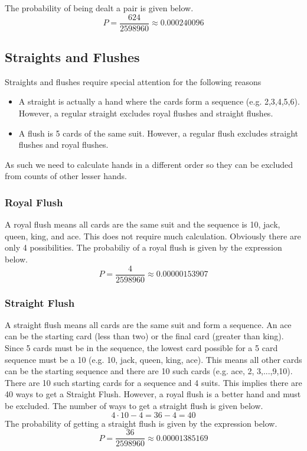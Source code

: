 The probability of being dealt a pair is given below.
$$P = \frac{624}{2598960} \approx 0.000240096$$

\subsection*{Straights and Flushes}
Straights and flushes require special attention for the following reasons
\begin{itemize}
    \item A straight is actually a hand where the cards form a sequence (e.g. 2,3,4,5,6).  However, a regular straight excludes royal flushes and straight flushes.
    \item A flush is 5 cards of the same suit.  However, a regular flush excludes straight flushes and royal flushes.
\end{itemize}
As such we need to calculate hands in a different order so they can be excluded from counts of other lesser hands.

\subsubsection*{Royal Flush}
A royal flush means all cards are the same suit and the sequence is 10, jack, queen, king, and ace.  This does not require much calculation.  Obviously there are only 4 possibilities.
The probabiliy of a royal flush is given by the expression below.
$$P = \frac{4}{2598960} \approx 0.00000153907$$

\subsubsection*{Straight Flush}
A straight flush means all cards are the same suit and form a sequence.  An ace can be the starting card (less than two) or the final card (greater than king).  Since 5 cards must be in the sequence, the lowest card possible for a 5 card sequence must be a 10 (e.g. 10, jack, queen, king, ace).  This means all other cards can be the starting sequence and there are 10 such cards (e.g. ace, 2, 3,...,9,10).   There are 10 such starting cards for a sequence and 4 suits.  This implies there are 40 ways to get a Straight Flush.  However, a royal flush is a better hand and must be excluded.  The number of ways to get a straight flush is given below. 
$$4 \cdot 10 - 4 = 36-4 = 40$$
The probability of getting a straight flush is given by the expression below.
$$P = \frac{36}{2598960} \approx 0.00001385169$$


